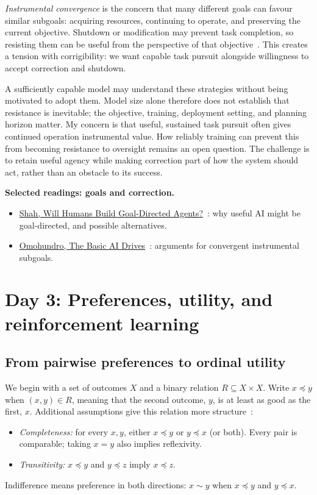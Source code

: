 \emph{Instrumental convergence} is the concern that many different goals can favour similar subgoals: acquiring resources, continuing to operate, and preserving the current objective. Shutdown or modification may prevent task completion, so resisting them can be useful from the perspective of that objective~\cite{omohundro2008drives}. This creates a tension with corrigibility: we want capable task pursuit alongside willingness to accept correction and shutdown.

A sufficiently capable model may understand these strategies without being motivated to adopt them. Model size alone therefore does not establish that resistance is inevitable; the objective, training, deployment setting, and planning horizon matter. My concern is that useful, sustained task pursuit often gives continued operation instrumental value. How reliably training can prevent this from becoming resistance to oversight remains an open question. The challenge is to retain useful agency while making correction part of how the system should act, rather than an obstacle to its success.

\noindent\textbf{Selected readings: goals and correction.}
\begin{itemize}
  \item \href{https://www.alignmentforum.org/posts/9zpT9dikrrebdq3Jf/will-humans-build-goal-directed-agents}{Shah, Will Humans Build Goal-Directed Agents?}~\cite{shah2019goalDirected}: why useful AI might be goal-directed, and possible alternatives.
  \item \href{https://selfawaresystems.com/wp-content/uploads/2008/01/ai_drives_final.pdf}{Omohundro, The Basic AI Drives}~\cite{omohundro2008drives}: arguments for convergent instrumental subgoals.
\end{itemize}

\section{Day 3: Preferences, utility, and reinforcement learning}

\subsection{From pairwise preferences to ordinal utility}

We begin with a set of outcomes $X$ and a binary relation $R\subseteq X\times X$. Write $x\preceq y$ when $(x,y)\in R$, meaning that the second outcome, $y$, is at least as good as the first, $x$. Additional assumptions give this relation more structure~\cite{rosas2026preferences}:
\begin{itemize}
  \item \emph{Completeness:} for every $x,y$, either $x\preceq y$ or $y\preceq x$ (or both). Every pair is comparable; taking $x=y$ also implies reflexivity.
  \item \emph{Transitivity:} $x\preceq y$ and $y\preceq z$ imply $x\preceq z$.
\end{itemize}
Indifference means preference in both directions: $x\sim y$ when $x\preceq y$ and $y\preceq x$.

